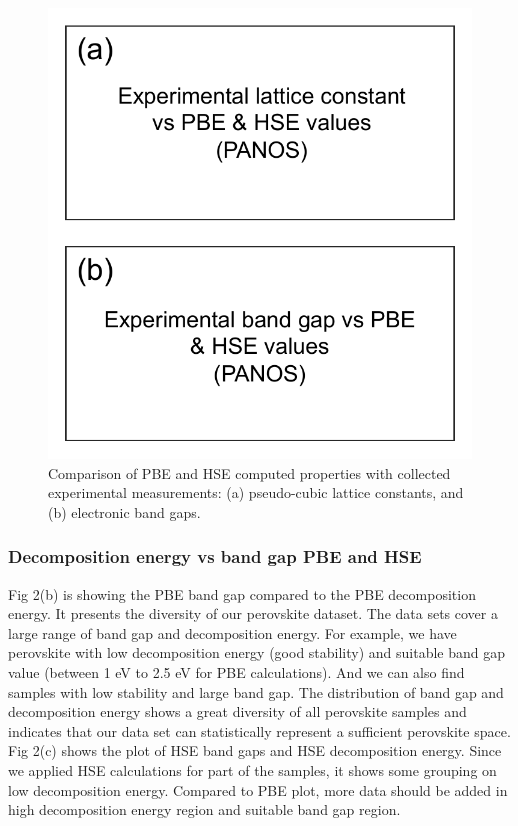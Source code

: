 \documentclass[twoside, twocolumn, 9pt, draft]{article}
\begin{document}
\begin{figure}
\centering
\includegraphics[width=.9\linewidth]{Figure3.pdf}
\caption{\label{Fig:lot_comp} Comparison of PBE and HSE computed properties with collected experimental measurements: (a) pseudo-cubic lattice constants, and (b) electronic band gaps.}
\end{figure}

\subsubsection*{Decomposition energy vs band gap PBE and HSE}
\label{sec:org340eaa3}
Fig 2(b) is showing the PBE band gap compared to the PBE decomposition
energy. It presents the diversity of our perovskite dataset. The data
sets cover a large range of band gap and decomposition energy. For
example, we have perovskite with low decomposition energy (good
stability) and suitable band gap value (between 1 eV to 2.5 eV for PBE
calculations). And we can also find samples with low stability and large
band gap. The distribution of band gap and decomposition energy shows a
great diversity of all perovskite samples and indicates that our data
set can statistically represent a sufficient perovskite space. Fig 2(c)
shows the plot of HSE band gaps and HSE decomposition energy. Since we
applied HSE calculations for part of the samples, it shows some grouping
on low decomposition energy. Compared to PBE plot, more data should be
added in high decomposition energy region and suitable band gap region.
\end{document}
